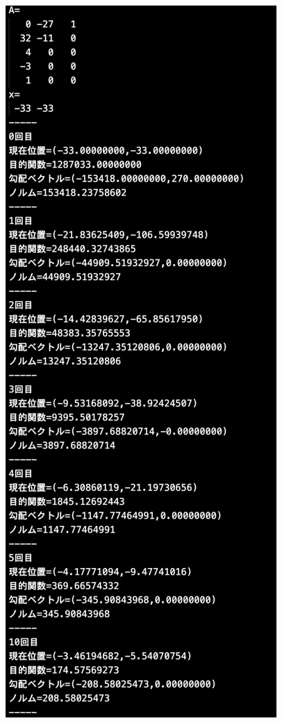 \documentclass[12pt]{jarticle}
\begin{document}
\clearpage
\begin{figure}[h]
    \begin{center}
        \includegraphics[scale=0.2]{kadai1_2n_out1_2_1.png}
    \end{center}

\end{figure}
\end{document}
